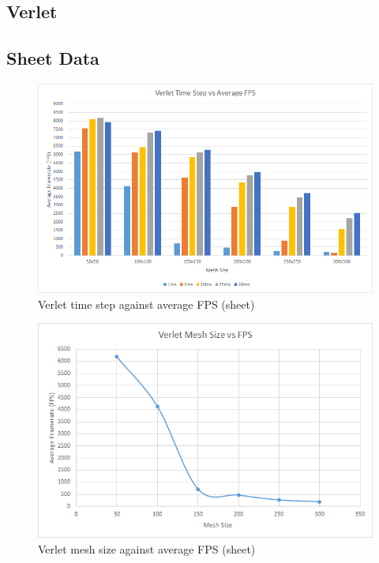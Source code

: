 \begin{landscape}
\section{Verlet}

\subsection{Sheet Data}

  \begin{figure}[!htb]
    \begin{center}
      \includegraphics{Figures/sheet_v_fps}
    \end{center}
    \caption{Verlet time step against average FPS (sheet)}
    \label{fig:v fps sheet}
  \end{figure}
\end{landscape}
  
    \begin{figure}
    \begin{center}
      \includegraphics[scale=.9]{Figures/sheet_v_m_fps}
    \end{center}
    \caption{Verlet mesh size against average FPS (sheet)}
    \label{fig:v mesh fps sheet}
  \end{figure}
  
